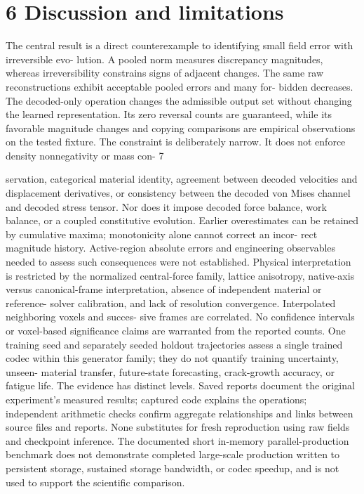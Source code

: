 \documentclass[11pt]{article}
\begin{document}
\section*{6 Discussion and limitations}

The central result is a direct counterexample to identifying small field error with irreversible evo-
lution. A pooled norm measures discrepancy magnitudes, whereas irreversibility constrains signs
of adjacent changes. The same raw reconstructions exhibit acceptable pooled errors and many for-
bidden decreases. The decoded-only operation changes the admissible output set without changing
the learned representation. Its zero reversal counts are guaranteed, while its favorable magnitude
changes and copying comparisons are empirical observations on the tested fixture.
The constraint is deliberately narrow. It does not enforce density nonnegativity or mass con-
7

servation, categorical material identity, agreement between decoded velocities and displacement
derivatives, or consistency between the decoded von Mises channel and decoded stress tensor. Nor
does it impose decoded force balance, work balance, or a coupled constitutive evolution. Earlier
overestimates can be retained by cumulative maxima; monotonicity alone cannot correct an incor-
rect magnitude history. Active-region absolute errors and engineering observables needed to assess
such consequences were not established.
Physical interpretation is restricted by the normalized central-force family, lattice anisotropy,
native-axis versus canonical-frame interpretation, absence of independent material or reference-
solver calibration, and lack of resolution convergence. Interpolated neighboring voxels and succes-
sive frames are correlated. No confidence intervals or voxel-based significance claims are warranted
from the reported counts. One training seed and separately seeded holdout trajectories assess a
single trained codec within this generator family; they do not quantify training uncertainty, unseen-
material transfer, future-state forecasting, crack-growth accuracy, or fatigue life.
The evidence has distinct levels. Saved reports document the original experiment’s measured
results; captured code explains the operations; independent arithmetic checks confirm aggregate
relationships and links between source files and reports. None substitutes for fresh reproduction
using raw fields and checkpoint inference. The documented short in-memory parallel-production
benchmark does not demonstrate completed large-scale production written to persistent storage,
sustained storage bandwidth, or codec speedup, and is not used to support the scientific comparison.
\end{document}
